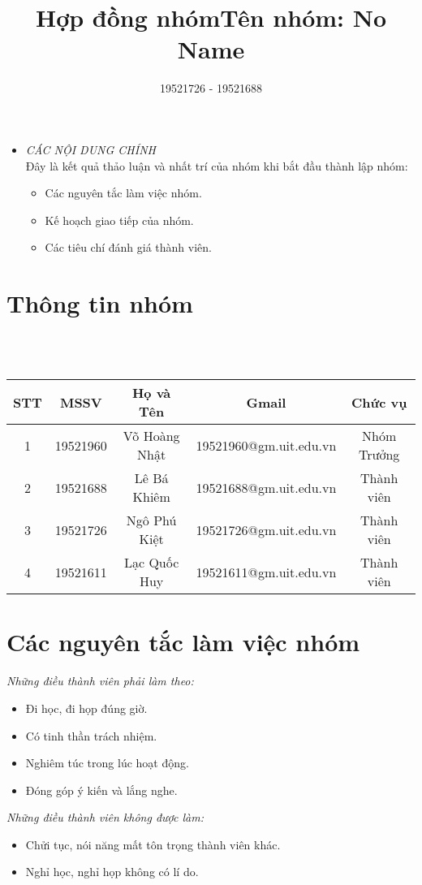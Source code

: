\documentclass[12pt, a4paper]{article}
\title{Hợp đồng nhóm}
\author{19521726 - 19521688 }
\begin{document}
\maketitle
\color{blue}
 \large\begin{itemize}
    \item\textit{CÁC NỘI DUNG CHÍNH}\\
      \small \color{black}
Đây là kết quả thảo luận và nhất trí của nhóm khi bắt đầu thành lập nhóm:
    \begin{itemize}
    \item Các nguyên tắc làm việc nhóm.
    \item Kế hoạch giao tiếp của nhóm.
    \item Các tiêu chí đánh giá thành viên.
    \end{itemize}
 \end{itemize}
\color{black}

\section{Thông tin nhóm}
  \small\title{Tên nhóm: No Name}\\ \\
    \begin{tabular}{|c|c|c|c|c|}
      \hline
        STT & MSSV & Họ và Tên & Gmail & Chức vụ \\
      \hline
         1 & 19521960 & Võ Hoàng Nhật & 19521960@gm.uit.edu.vn & Nhóm Trưởng\\
      \hline
         2 & 19521688 & Lê Bá Khiêm & 19521688@gm.uit.edu.vn & Thành viên\\
      \hline
         3 & 19521726 & Ngô Phú Kiệt & 19521726@gm.uit.edu.vn & Thành viên\\
      \hline
         4 & 19521611 & Lạc Quốc Huy & 19521611@gm.uit.edu.vn & Thành viên \\
         \hline
    \end{tabular}
\section{Các nguyên tắc làm việc nhóm}
   \textit{Những điều thành viên phải làm theo:}
   \begin{itemize}
         \item Đi học, đi họp đúng giờ.
         \item Có tinh thần trách nhiệm.
         \item Nghiêm túc trong lúc hoạt động.
         \item Đóng góp ý kiến và lắng nghe.
 \end{itemize} 
     \textit{Những điều thành viên không được làm:}
   \begin{itemize}
      \item Chửi tục, nói năng mất tôn trọng thành viên khác.
      \item Nghỉ học, nghỉ họp không có lí do.
 \end{itemize}     
\end{document}
